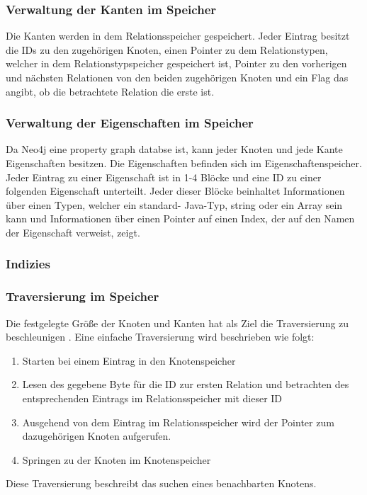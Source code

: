 \subsubsection{Verwaltung der Kanten im Speicher}
Die Kanten werden in dem Relationsspeicher gespeichert. Jeder Eintrag besitzt die IDs zu den zugehörigen Knoten, einen Pointer zu dem Relationstypen, welcher in dem Relationstypspeicher gespeichert ist, Pointer zu den vorherigen und nächsten Relationen von den beiden zugehörigen Knoten und ein Flag das angibt, ob die betrachtete Relation die erste ist. \newline
\subsubsection{Verwaltung der Eigenschaften im Speicher}
Da Neo4j eine property graph databse ist, kann jeder Knoten und jede Kante  Eigenschaften besitzen. Die Eigenschaften befinden sich im Eigenschaftenspeicher.  Jeder Eintrag zu einer Eigenschaft ist in 1-4 Blöcke und eine ID zu einer folgenden Eigenschaft unterteilt. Jeder dieser Blöcke beinhaltet Informationen über einen Typen, welcher ein standard- Java-Typ, string oder ein Array sein kann und Informationen über einen Pointer auf einen Index, der auf den Namen der Eigenschaft verweist, zeigt.  \newline
\subsubsection{Indizies}
\subsubsection {Traversierung im Speicher}
Die festgelegte Größe der Knoten und Kanten hat als Ziel die Traversierung zu beschleunigen \parencite{robinson2013graph}. Eine einfache Traversierung wird beschrieben wie folgt: 
\begin{enumerate}
	\item Starten bei einem Eintrag in den Knotenspeicher
	\item Lesen des gegebene Byte für die ID zur ersten Relation und betrachten des entsprechenden Eintrags im Relationsspeicher mit dieser ID
	\item Ausgehend von dem Eintrag im Relationsspeicher wird der Pointer zum dazugehörigen Knoten aufgerufen.
	\item Springen zu der Knoten im Knotenspeicher
\end{enumerate}
Diese Traversierung beschreibt das suchen eines benachbarten Knotens.

